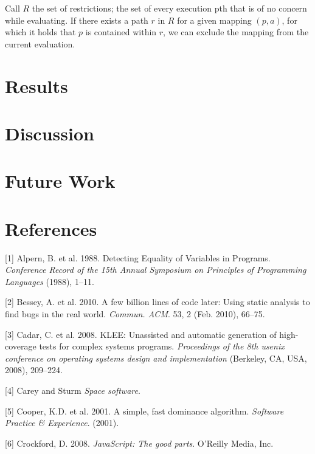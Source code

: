 \documentclass[]{article}
\begin{document}
Call \(R\) the set of restrictions; the set of every execution pth that
is of no concern while evaluating. If there exists a path \(r\) in \(R\)
for a given mapping \((p, a)\), for which it holds that \(p\) is
contained within \(r\), we can exclude the mapping from the current
evaluation.

\section{Results}\label{results}

\section{Discussion}\label{discussion}

\section{Future Work}\label{future-work}

\section*{References}\label{references}

\hypertarget{refs}{}
\hypertarget{ref-equality}{}
{[}1{]} Alpern, B. et al. 1988. Detecting Equality of Variables in
Programs. \emph{Conference Record of the 15th Annual Symposium on
Principles of Programming Languages} (1988), 1--11.

\hypertarget{ref-coverity}{}
{[}2{]} Bessey, A. et al. 2010. A few billion lines of code later: Using
static analysis to find bugs in the real world. \emph{Commun. ACM}. 53,
2 (Feb. 2010), 66--75.

\hypertarget{ref-symb3}{}
{[}3{]} Cadar, C. et al. 2008. KLEE: Unassisted and automatic generation
of high-coverage tests for complex systems programs. \emph{Proceedings
of the 8th usenix conference on operating systems design and
implementation} (Berkeley, CA, USA, 2008), 209--224.

\hypertarget{ref-nasa2}{}
{[}4{]} Carey and Sturm \emph{Space software}.

\hypertarget{ref-dominance}{}
{[}5{]} Cooper, K.D. et al. 2001. A simple, fast dominance algorithm.
\emph{Software Practice \& Experience}. (2001).

\hypertarget{ref-goodparts}{}
{[}6{]} Crockford, D. 2008. \emph{JavaScript: The good parts}. O'Reilly
Media, Inc.
\end{document}
